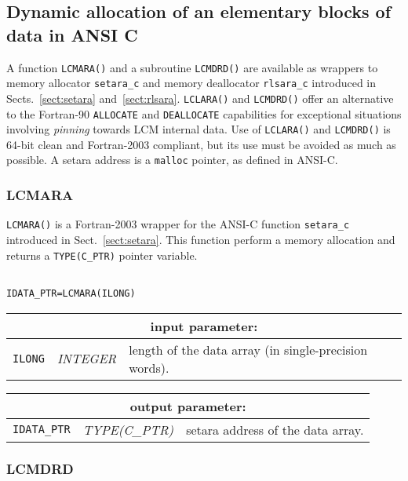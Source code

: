 \subsection{Dynamic allocation of an elementary blocks of data in ANSI C}

A function {\tt LCMARA()} and a subroutine {\tt LCMDRD()} are available as wrappers to memory allocator
{\tt setara\_c} and memory deallocator {\tt rlsara\_c} introduced in Sects.~\ref{sect:setara} and~\ref{sect:rlsara}.
{\tt LCLARA()} and {\tt LCMDRD()} offer an alternative to the Fortran-90 {\tt ALLOCATE} and {\tt DEALLOCATE}
capabilities for exceptional situations involving {\sl pinning} towards LCM internal data. Use of {\tt LCLARA()}
and {\tt LCMDRD()} is 64-bit clean and Fortran-2003 compliant, but its use must be avoided as much as possible. A
setara address is a {\tt malloc} pointer, as defined in ANSI-C.

\subsubsection{LCMARA}\label{sect:LCMARA}

{\tt LCMARA()} is a Fortran-2003 wrapper for the ANSI-C function {\tt setara\_c} introduced in Sect.~\ref{sect:setara}. This function
perform a memory allocation and returns a {\tt TYPE(C\_PTR)} pointer variable.

\begin{verbatim}

IDATA_PTR=LCMARA(ILONG)
\end{verbatim}

\noindent
\begin{tabular}{|p{1.5cm}|p{3cm}|p{10cm}|}
\hline
\multicolumn{3}{|c|}{\bf input parameter:} \\
\hline
{\tt ILONG} & {\it INTEGER} & length of the data array (in single-precision words). \\
\hline
\end{tabular}

\vskip 0.8cm

\noindent
\begin{tabular}{|p{1.5cm}|p{3cm}|p{10cm}|}
\hline
\multicolumn{3}{|c|}{\bf output parameter:} \\
\hline
{\tt IDATA\_PTR} & {\it TYPE(C\_PTR)} & setara address of the data array. \\
\hline
\end{tabular}

\subsubsection{LCMDRD}\label{sect:LCMDRD}

